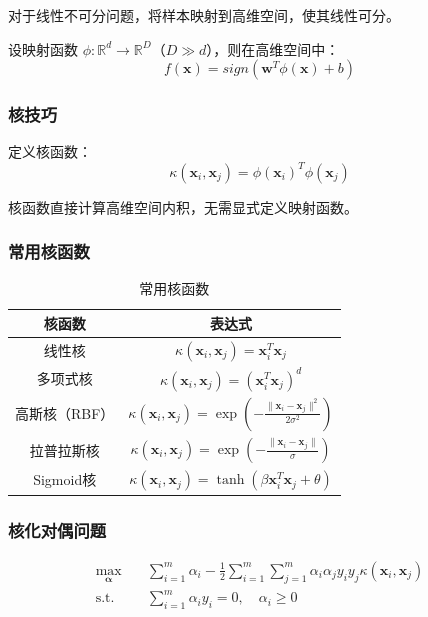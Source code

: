 \documentclass[12pt,a4paper]{ctexart}
\begin{document}
对于线性不可分问题，将样本映射到高维空间，使其线性可分。

设映射函数 $\phi: \mathbb{R}^d \to \mathbb{R}^D$（$D \gg d$），则在高维空间中：
\[
f(\mathbf{x}) = sign\left(\mathbf{w}^T\phi(\mathbf{x}) + b\right)
\]

\subsubsection{核技巧}

定义核函数：
\[
\kappa(\mathbf{x}_i, \mathbf{x}_j) = \phi(\mathbf{x}_i)^T\phi(\mathbf{x}_j)
\]

核函数直接计算高维空间内积，无需显式定义映射函数。

\subsubsection{常用核函数}

\begin{table}[H]
\centering
\caption{常用核函数}
\begin{tabular}{cc}
\toprule
\textbf{核函数} & \textbf{表达式} \\
\midrule
线性核 & $\kappa(\mathbf{x}_i, \mathbf{x}_j) = \mathbf{x}_i^T\mathbf{x}_j$ \\
多项式核 & $\kappa(\mathbf{x}_i, \mathbf{x}_j) = (\mathbf{x}_i^T\mathbf{x}_j)^d$ \\
高斯核（RBF） & $\kappa(\mathbf{x}_i, \mathbf{x}_j) = \exp\left(-\frac{\|\mathbf{x}_i - \mathbf{x}_j\|^2}{2\sigma^2}\right)$ \\
拉普拉斯核 & $\kappa(\mathbf{x}_i, \mathbf{x}_j) = \exp\left(-\frac{\|\mathbf{x}_i - \mathbf{x}_j\|}{\sigma}\right)$ \\
Sigmoid核 & $\kappa(\mathbf{x}_i, \mathbf{x}_j) = \tanh(\beta\mathbf{x}_i^T\mathbf{x}_j + \theta)$ \\
\bottomrule
\end{tabular}
\end{table}

\subsubsection{核化对偶问题}

\begin{align}
\max_{\boldsymbol{\alpha}} \quad & \sum_{i=1}^{m}\alpha_i - \frac{1}{2}\sum_{i=1}^{m}\sum_{j=1}^{m}\alpha_i\alpha_j y_i y_j \kappa(\mathbf{x}_i, \mathbf{x}_j) \\
\text{s.t.} \quad & \sum_{i=1}^{m}\alpha_i y_i = 0, \quad \alpha_i \geq 0
\end{align}
\end{document}
